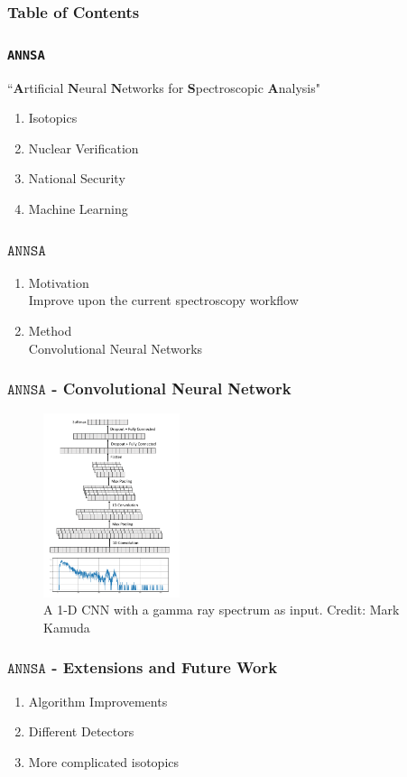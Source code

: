 \graphicspath{{./images/}}

	\begin{frame}
		\frametitle{Table of Contents}
		\tableofcontents
	\end{frame}


	\begin{frame}
		\frametitle{\texttt{ANNSA}}
		``$\textbf{A}$rtificial $\textbf{N}$eural $\textbf{N}$etworks for $\textbf{S}$pectroscopic $\textbf{A}$nalysis"\\
		\begin{enumerate}
			\item Isotopics
			\item Nuclear Verification
			\item National Security 
			\item Machine Learning
		\end{enumerate}
	\end{frame}	
	\begin{frame}
		\frametitle{$\texttt{ANNSA}$}
		\begin{enumerate}
			\item Motivation\\
			Improve upon the current spectroscopy workflow
			\item Method\\
			Convolutional Neural Networks
		\end{enumerate} 
	\end{frame}
	\begin{frame}
		\frametitle{$\texttt{ANNSA}$ - Convolutional Neural Network}
		\begin{figure}
			\includegraphics[width=4cm]{cnn-figure.png}
			\caption{A 1-D CNN with a gamma ray spectrum as input. Credit: Mark Kamuda}
		\end{figure}
	\end{frame}

	\begin{frame}
		\frametitle{$\texttt{ANNSA}$ - Extensions and Future Work}
		\begin{enumerate}
			\item Algorithm Improvements
			\item Different Detectors
			\item More complicated isotopics
		\end{enumerate}
	\end{frame}


